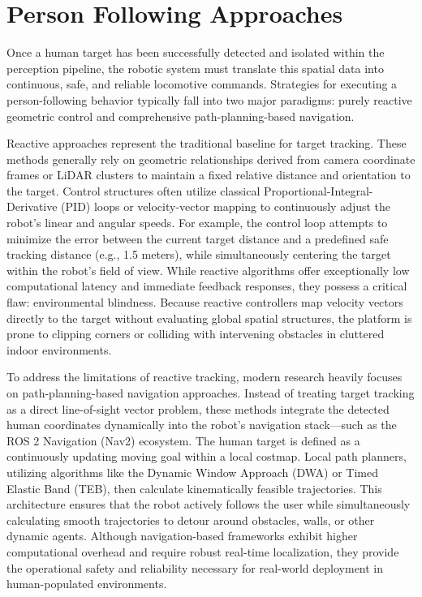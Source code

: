 \section{Person Following Approaches}
Once a human target has been successfully detected and isolated within the perception pipeline, the robotic system must translate this spatial data into continuous, safe, and reliable locomotive commands. Strategies for executing a person-following behavior typically fall into two major paradigms: purely reactive geometric control and comprehensive path-planning-based navigation. 

Reactive approaches represent the traditional baseline for target tracking. These methods generally rely on geometric relationships derived from camera coordinate frames or LiDAR clusters to maintain a fixed relative distance and orientation to the target. Control structures often utilize classical Proportional-Integral-Derivative (PID) loops or velocity-vector mapping to continuously adjust the robot’s linear and angular speeds. For example, the control loop attempts to minimize the error between the current target distance and a predefined safe tracking distance (e.g., 1.5 meters), while simultaneously centering the target within the robot's field of view. While reactive algorithms offer exceptionally low computational latency and immediate feedback responses, they possess a critical flaw: environmental blindness. Because reactive controllers map velocity vectors directly to the target without evaluating global spatial structures, the platform is prone to clipping corners or colliding with intervening obstacles in cluttered indoor environments.

To address the limitations of reactive tracking, modern research heavily focuses on path-planning-based navigation approaches. Instead of treating target tracking as a direct line-of-sight vector problem, these methods integrate the detected human coordinates dynamically into the robot's navigation stack—such as the ROS 2 Navigation (Nav2) ecosystem. The human target is defined as a continuously updating moving goal within a local costmap. Local path planners, utilizing algorithms like the Dynamic Window Approach (DWA) or Timed Elastic Band (TEB), then calculate kinematically feasible trajectories. This architecture ensures that the robot actively follows the user while simultaneously calculating smooth trajectories to detour around obstacles, walls, or other dynamic agents. Although navigation-based frameworks exhibit higher computational overhead and require robust real-time localization, they provide the operational safety and reliability necessary for real-world deployment in human-populated environments.


